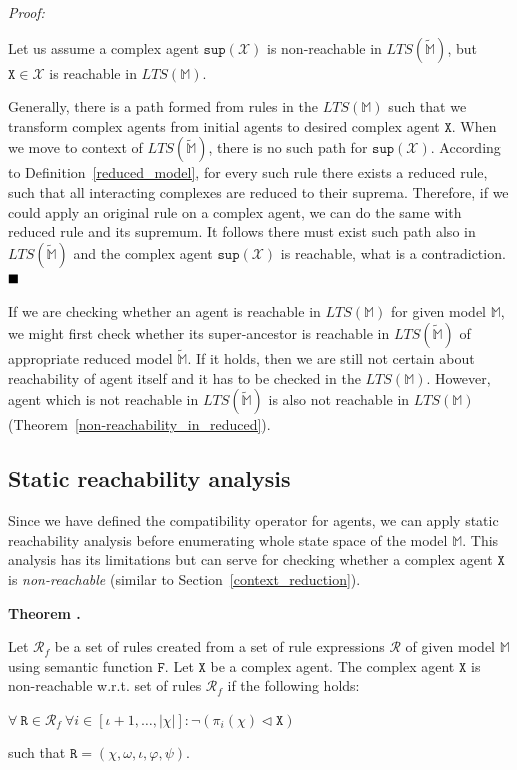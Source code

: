 \documentclass[12pt, twoside]{fithesis2} %
\newcounter{counter}[section]
\renewcommand{\thecounter}{\thesection.\arabic{counter}}
\newenvironment{proof}{\noindent\emph{Proof:~ }\nopagebreak \begin{itshape}}{\end{itshape}\bigskip}
\newenvironment{theorem}{\bigskip\refstepcounter{counter}\noindent\textbf{Theorem \thecounter }\nopagebreak \begin{itshape}}{\end{itshape}\medskip}
\newcommand*{\QEDA}{\hfill\ensuremath{\blacksquare}}%
\begin{document}
\begin{proof}
Let us assume a complex agent $\mathtt{sup}(\mathscr{X})$ is non-reachable in $LTS(\widetilde{\mathds{M}})$, but $\mathtt{X} \in \mathscr{X}$ is reachable in $LTS(\mathds{M})$.

Generally, there is a path formed from rules in the $LTS(\mathds{M})$ such that we transform complex agents from initial agents to desired complex agent $\mathtt{X}$. When we move to context of $LTS(\widetilde{\mathds{M}})$, there is no such path for $\mathtt{sup}(\mathscr{X})$. According to Definition~\ref{reduced_model}, for every such rule there exists a reduced rule, such that all interacting complexes are reduced to their suprema. Therefore, if we could apply an original rule on a complex agent, we can do the same with reduced rule and its supremum. It follows there must exist such path also in $LTS(\widetilde{\mathds{M}})$ and the complex agent $\mathtt{sup}(\mathscr{X})$ is reachable, what is a contradiction. $\QEDA$
\end{proof}

If we are checking whether an agent is reachable in $LTS(\mathds{M})$ for given model $\mathds{M}$, we might first check whether its super-ancestor is reachable in $LTS(\widetilde{\mathds{M}})$ of appropriate reduced model $\widetilde{\mathds{M}}$. If it holds, then we are still not certain about reachability of agent itself and it has to be checked in the $LTS(\mathds{M})$. However, agent which is not reachable in $LTS(\widetilde{\mathds{M}})$ is also not reachable in $LTS(\mathds{M})$ (Theorem~\ref{non-reachability_in_reduced}).

\subsection{Static reachability analysis}
\label{static_reachability_analysis}

Since we have defined the compatibility operator for agents, we can apply static reachability analysis before enumerating whole state space of the model $\mathds{M}$. This analysis has its limitations but can serve for checking whether a complex agent $\mathtt{X}$ is \emph{non-reachable} (similar to Section~\ref{context_reduction}).

\begin{theorem}
\label{static_reach}
Let $\mathcal{R}_f$ be a set of rules created from a set of rule expressions $\mathcal{R}$ of given model $\mathds{M}$ using semantic function $\mathtt{F}$. Let $\mathtt{X}$ be a complex agent. The complex agent $\mathtt{X}$ is non-reachable w.r.t. set of rules $\mathcal{R}_f$ if the following holds:

\begin{center}
$\forall~ \mathtt{R} \in \mathcal{R}_f ~\forall i \in [\iota+1, \ldots, |\chi|] : \neg ( \pi_i(\chi) \lhd \mathtt{X})$
\end{center}

\noindent such that $\mathtt{R} = (\chi, \omega, \iota, \varphi, \psi)$.
\end{theorem}
\end{document}

